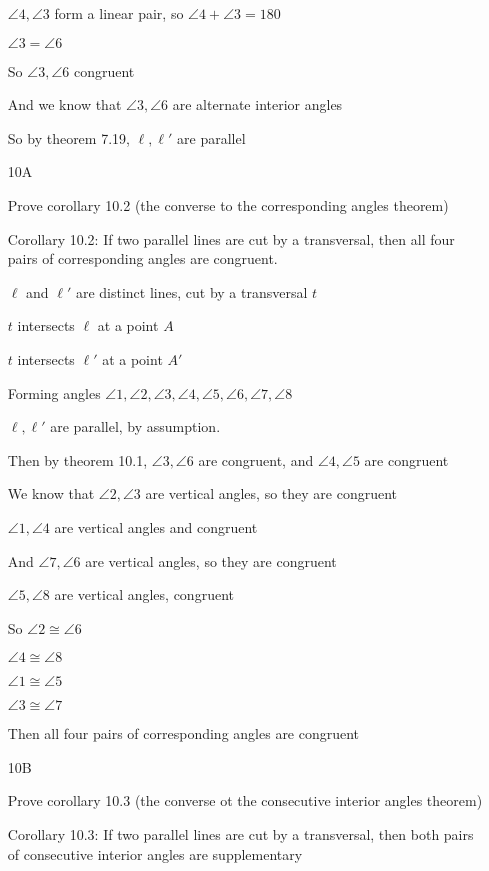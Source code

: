 \documentclass[11pt]{article}
\begin{document}
\begin{itemize}
		$\angle 4, \angle 3$ form a linear pair, so $\angle 4 + \angle 3 = 180$

		$\angle 3 = \angle 6$

		So $\angle 3, \angle 6$ congruent

		And we know that $\angle 3, \angle 6$ are alternate interior angles

		So by theorem 7.19, $\ell, \ell'$ are parallel

	\item[10A]

		Prove corollary 10.2 (the converse to the corresponding angles theorem)

		Corollary 10.2: If two parallel lines are cut by a transversal, then all four pairs of corresponding angles are congruent.

		$\ell$ and $\ell'$ are distinct lines, cut by a transversal $t$

		$t$ intersects $\ell$ at a point $A$

		$t$ intersects $\ell'$ at a point $A'$

		Forming angles $\angle 1, \angle 2, \angle 3, \angle 4, \angle 5, \angle 6, \angle 7, \angle 8$

		$\ell, \ell'$ are parallel, by assumption.

		Then by theorem 10.1, $\angle 3, \angle 6$ are congruent, and $\angle 4, \angle 5$ are congruent

		We know that $\angle 2, \angle 3$ are vertical angles, so they are congruent

		$\angle 1, \angle 4$ are vertical angles and congruent

		And $\angle 7, \angle 6$ are vertical angles, so they are congruent

		$\angle 5, \angle 8$ are vertical angles, congruent

		So $\angle 2 \cong \angle 6$

		$\angle 4 \cong \angle 8$

		$\angle 1 \cong \angle 5$

		$\angle 3 \cong \angle 7$

		Then all four pairs of corresponding angles are congruent

	\item[10B]

		Prove corollary 10.3 (the converse ot the consecutive interior angles theorem)

		Corollary 10.3: If two parallel lines are cut by a transversal, then both pairs of consecutive interior angles are supplementary


\end{itemize}
\end{document}
